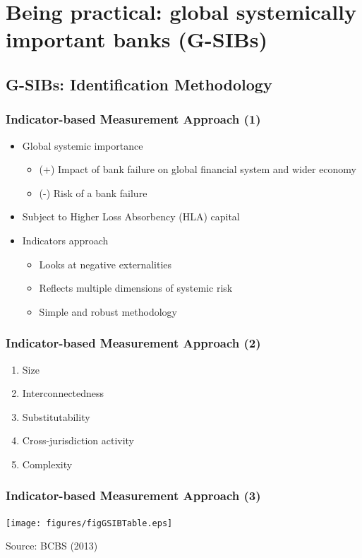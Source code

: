 \documentclass[aspectratio=43,dvipsnames,usenames, svgnames]{beamer}
\begin{document}
\section{Being practical: global systemically important banks (G-SIBs)}

\subsection{G-SIBs: Identification Methodology}

\begin{frame} %
\frametitle{Indicator-based Measurement Approach (1)}
	\begin{itemize}
		\item Global systemic importance
		\begin{itemize}
			\item (+) Impact of bank failure on global financial system and wider economy
			\item (-) Risk of a bank failure
		\end{itemize}
		\smallskip
		\item Subject to Higher Loss Absorbency (HLA) capital
		\smallskip
		\item Indicators approach
		\begin{itemize}
			\item Looks at negative externalities
			\item Reflects multiple dimensions of systemic risk
			\item Simple and robust methodology
		\end{itemize}
	\end{itemize}
\end{frame}

\begin{frame} %
\frametitle{Indicator-based Measurement Approach (2)}
	\begin{enumerate}
	[default]
		\item Size
		\medskip
		\item Interconnectedness
		\medskip
		\item Substitutability
		\medskip
		\item Cross-jurisdiction activity
		\medskip
		\item Complexity
	\end{enumerate}
\end{frame}

\begin{frame} %
\frametitle{Indicator-based Measurement Approach (3)}
\begin{center}
	\texttt{[image: figures/figGSIBTable.eps]}
\end{center}
\begin{flushleft}
	\tiny{Source: BCBS (2013)}
\end{flushleft}
\end{frame}
\end{document}
